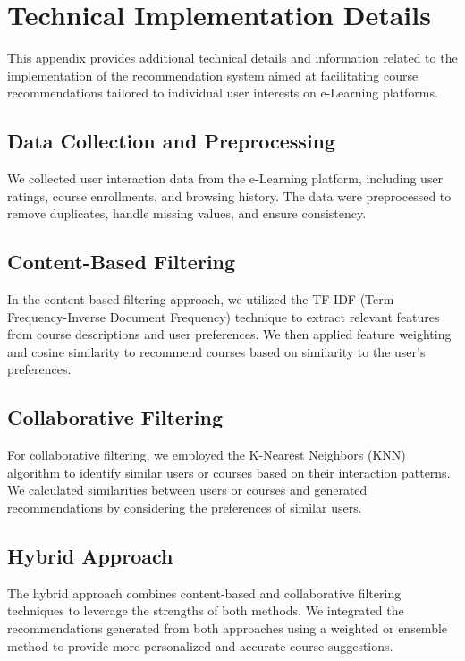 \chapter{Technical Implementation Details}

This appendix provides additional technical details and information 
related to the implementation of the \textsf{recommendation system} aimed at 
facilitating course recommendations tailored to individual user 
interests on e-Learning platforms.

\section{Data Collection and Preprocessing}

We collected user interaction data from the e-Learning platform, 
including user ratings, course enrollments, and browsing history. 
The data were preprocessed to remove duplicates, handle missing 
values, and ensure consistency.

\section{Content-Based Filtering}

In the content-based filtering approach, we utilized the TF-IDF 
(Term Frequency-Inverse Document Frequency) technique to extract 
relevant features from course descriptions and user preferences. 
We then applied feature weighting and cosine similarity to 
recommend courses based on similarity to the user's preferences.

\section{Collaborative Filtering}

For collaborative filtering, we employed the K-Nearest Neighbors 
(KNN) algorithm to identify similar users or courses based on their 
interaction patterns. We calculated similarities between users or 
courses and generated recommendations by considering the preferences 
of similar users.

\section{Hybrid Approach}

The hybrid approach combines content-based and collaborative filtering 
techniques to leverage the strengths of both methods. We integrated the 
recommendations generated from both approaches using a weighted or ensemble 
method to provide more personalized and accurate course suggestions.

